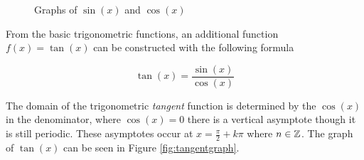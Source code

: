         \begin{figure}
            \centering
            \caption{Graphs of $\sin(x)$ and $\cos(x)$}
            \label{fig:triggraph}
        \end{figure}

        From the basic trigonometric functions, an additional function $f(x) = \tan(x)$ can be constructed with the following formula

        \begin{equation}
            \tan(x) = \frac{\sin(x)}{\cos(x)}
        \end{equation}

        The domain of the trigonometric \textit{tangent} function is determined by the $\cos(x)$ in the denominator, where $\cos(x) = 0$ there is a vertical asymptote though it is still periodic. These asymptotes occur at $x = \frac{\pi}{2} + k\pi$ where $n \in \mathbb{Z}$. The graph of $\tan(x)$ can be seen in Figure \ref{fig:tangentgraph}.

